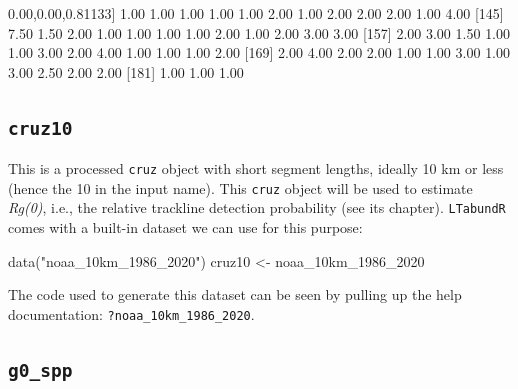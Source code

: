\documentclass[
]{book}
\newenvironment{Shaded}{\begin{snugshade}}{\end{snugshade}}
\newcommand{\DecValTok}[1]{\textcolor[rgb]{0.00,0.00,0.81}{#1}}
\newcommand{\FloatTok}[1]{\textcolor[rgb]{0.00,0.00,0.81}{#1}}
\newcommand{\FunctionTok}[1]{\textcolor[rgb]{0.00,0.00,0.00}{#1}}
\newcommand{\NormalTok}[1]{#1}
\newcommand{\OtherTok}[1]{\textcolor[rgb]{0.56,0.35,0.01}{#1}}
\newcommand{\StringTok}[1]{\textcolor[rgb]{0.31,0.60,0.02}{#1}}
\begin{document}
\begin{Shaded}
\begin{Highlighting}[]
\NormalTok{[}\DecValTok{133}\NormalTok{]  }\FloatTok{1.00}  \FloatTok{1.00}  \FloatTok{1.00}  \FloatTok{1.00}  \FloatTok{1.00}  \FloatTok{2.00}  \FloatTok{1.00}  \FloatTok{2.00}  \FloatTok{2.00}  \FloatTok{2.00}  \FloatTok{1.00}  \FloatTok{4.00}
\NormalTok{[}\DecValTok{145}\NormalTok{]  }\FloatTok{7.50}  \FloatTok{1.50}  \FloatTok{2.00}  \FloatTok{1.00}  \FloatTok{1.00}  \FloatTok{1.00}  \FloatTok{1.00}  \FloatTok{2.00}  \FloatTok{1.00}  \FloatTok{2.00}  \FloatTok{3.00}  \FloatTok{3.00}
\NormalTok{[}\DecValTok{157}\NormalTok{]  }\FloatTok{2.00}  \FloatTok{3.00}  \FloatTok{1.50}  \FloatTok{1.00}  \FloatTok{1.00}  \FloatTok{3.00}  \FloatTok{2.00}  \FloatTok{4.00}  \FloatTok{1.00}  \FloatTok{1.00}  \FloatTok{1.00}  \FloatTok{2.00}
\NormalTok{[}\DecValTok{169}\NormalTok{]  }\FloatTok{2.00}  \FloatTok{4.00}  \FloatTok{2.00}  \FloatTok{2.00}  \FloatTok{1.00}  \FloatTok{1.00}  \FloatTok{3.00}  \FloatTok{1.00}  \FloatTok{3.00}  \FloatTok{2.50}  \FloatTok{2.00}  \FloatTok{2.00}
\NormalTok{[}\DecValTok{181}\NormalTok{]  }\FloatTok{1.00}  \FloatTok{1.00}  \FloatTok{1.00}
\end{Highlighting}
\end{Shaded}

\hypertarget{cruz10}{%
\subsection*{\texorpdfstring{\texttt{cruz10}}{cruz10}}\label{cruz10}}

This is a processed \texttt{cruz} object with short segment lengths, ideally 10 km or less (hence the 10 in the input name). This \texttt{cruz} object will be used to estimate \emph{Rg(0)}, i.e., the relative trackline detection probability (see its chapter). \texttt{LTabundR} comes with a built-in dataset we can use for this purpose:

\begin{Shaded}
\begin{Highlighting}[]
\FunctionTok{data}\NormalTok{(}\StringTok{"noaa\_10km\_1986\_2020"}\NormalTok{)}
\NormalTok{cruz10 }\OtherTok{\textless{}{-}}\NormalTok{ noaa\_10km\_1986\_2020}
\end{Highlighting}
\end{Shaded}

The code used to generate this dataset can be seen by pulling up the help documentation: \texttt{?noaa\_10km\_1986\_2020}.

\hypertarget{g0_spp}{%
\subsection*{\texorpdfstring{\texttt{g0\_spp}}{g0\_spp}}\label{g0_spp}}
\end{document}
